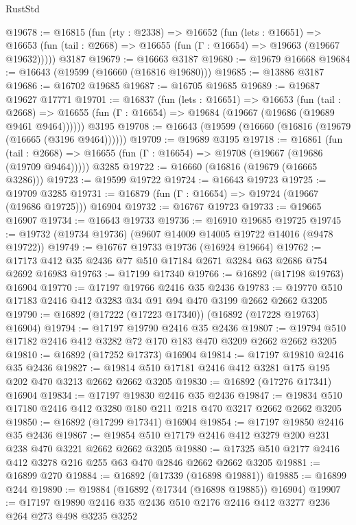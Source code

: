 \begin{lexlean}{RustStd}
\begin{coremodule}
@19678 := @16815
    (fun (rty : @2338) =>
    @16652
      (fun (lets : @16651) =>
      @16653 (fun (tail : @2668) => @16655 (fun (Γ : @16654) => @19663 (@19667 @19632)))))
    @3187
@19679 := @16663 @3187
@19680 := @19679 @16668
@19684 := @16643 (@19599 (@16660 (@16816 @19680)))
@19685 := @13886 @3187
@19686 := @16702 @19685
@19687 := @16705 @19685
@19689 := @19687 @19627 @17771
@19701 := @16837
    (fun (lets : @16651) =>
    @16653
      (fun (tail : @2668) =>
      @16655 (fun (Γ : @16654) => @19684 (@19667 (@19686 (@19689 @9461 @9464))))))
    @3195
@19708 := @16643 (@19599 (@16660 (@16816 (@19679 (@16665 (@3196 @9464))))))
@19709 := @19689 @3195
@19718 := @16861
    (fun (tail : @2668) => @16655 (fun (Γ : @16654) => @19708 (@19667 (@19686 (@19709 @9464)))))
    @3285
@19722 := @16660 (@16816 (@19679 (@16665 @3286)))
@19723 := @19599 @19722
@19724 := @16643 @19723
@19725 := @19709 @3285
@19731 := @16879 (fun (Γ : @16654) => @19724 (@19667 (@19686 @19725))) @16904
@19732 := @16767 @19723
@19733 := @19665 @16907
@19734 := @16643 @19733
@19736 := @16910 @19685 @19725
@19745 := @19732 (@19734 @19736) (@9607 @14009 @14005 @19722 @14016 (@9478 @19722))
@19749 := @16767 @19733 @19736 (@16924 @19664)
@19762 := @17173 @412 @35 @2436 @77 @510 @17184 @2671 @3284 @63 @2686 @754 @2692 @16983
@19763 := @17199 @17340
@19766 := @16892 (@17198 @19763) @16904
@19770 := @17197 @19766 @2416 @35 @2436
@19783 := @19770 @510 @17183 @2416 @412 @3283 @34 @91 @94 @470 @3199 @2662 @2662 @3205
@19790 := @16892 (@17222 (@17223 @17340)) (@16892 (@17228 @19763) @16904)
@19794 := @17197 @19790 @2416 @35 @2436
@19807 := @19794 @510 @17182 @2416 @412 @3282 @72 @170 @183 @470 @3209 @2662 @2662 @3205
@19810 := @16892 (@17252 @17373) @16904
@19814 := @17197 @19810 @2416 @35 @2436
@19827 := @19814 @510 @17181 @2416 @412 @3281 @175 @195 @202 @470 @3213 @2662 @2662 @3205
@19830 := @16892 (@17276 @17341) @16904
@19834 := @17197 @19830 @2416 @35 @2436
@19847 := @19834 @510 @17180 @2416 @412 @3280 @180 @211 @218 @470 @3217 @2662 @2662 @3205
@19850 := @16892 (@17299 @17341) @16904
@19854 := @17197 @19850 @2416 @35 @2436
@19867 := @19854 @510 @17179 @2416 @412 @3279 @200 @231 @238 @470 @3221 @2662 @2662 @3205
@19880 := @17325 @510 @2177 @2416 @412 @3278 @216 @255 @63 @470 @2846 @2662 @2662 @3205
@19881 := @16899 @270
@19884 := @16892 (@17339 (@16898 @19881))
@19885 := @16899 @244
@19890 := @19884 (@16892 (@17344 (@16898 @19885)) @16904)
@19907 := @17197
    @19890
    @2416
    @35
    @2436
    @510
    @2176
    @2416
    @412
    @3277
    @236
    @264
    @273
    @498
    @3235
    @3252

\end{coremodule}
\end{lexlean}
